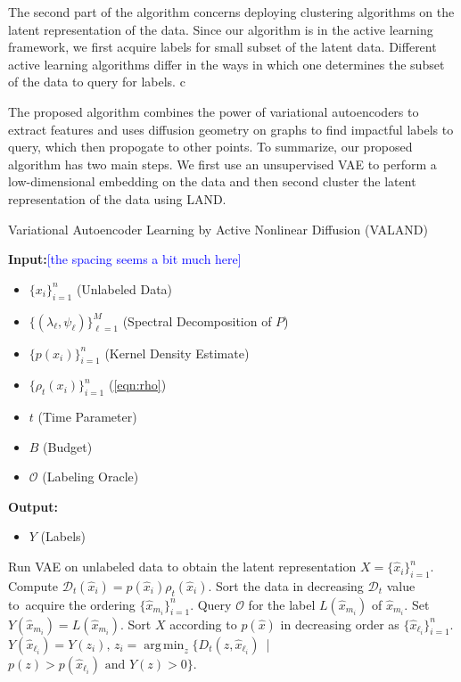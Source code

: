 \documentclass{article}
\def\hx{{\hat x}}
\newcommand{\Dt}{\mathcal{D}_{t}}
\DeclareMathOperator*{\argmin}{arg\,min}
\newcommand{\JMM}[1]{{\textcolor{blue}{[#1]}}}
\begin{document}
The second part of the algorithm concerns deploying clustering algorithms on the latent representation of the data. Since our algorithm is in the active learning framework, we first acquire labels for small subset of the latent data. Different active learning algorithms differ in the ways in which one determines the subset of the data to query for labels. c


The proposed algorithm combines the power of variational autoencoders to extract features and uses diffusion geometry on graphs to find impactful labels to query, which then propogate to other points. To summarize, our proposed algorithm has two main steps.  We first use an unsupervised VAE to perform a low-dimensional embedding on the data and then second cluster the latent representation of the data using LAND. 

\begin{algorithm}[!htb]
	\caption{\label{alg:VALAND}Variational Autoencoder Learning by Active Nonlinear Diffusion (VALAND)}
	\flushleft
	\flushleft
	\textbf{Input:}\JMM{the spacing seems a bit much here}
	\vspace{-0.3em}
	\begin{itemize}
	\item $\{x_{i}\}_{i=1}^{n}$ (Unlabeled Data)\\
	 \item $\{(\lambda_{\ell},\psi_{\ell})\}_{\ell=1}^{M}$ (Spectral Decomposition of $P$)\\
	 \item $\{p(x_{i})\}_{i=1}^{n}$ (Kernel Density Estimate)\\
	 \item $\{\rho_{t}(x_{i})\}_{i=1}^{n}$ (\ref{eqn:rho})\\
	 \item $t$ (Time Parameter)\\
	 \item $B$ (Budget)\\
	 \item $\mathcal{O}$ (Labeling Oracle)\\
	  \end{itemize}
	\textbf{Output:} 
	\begin{itemize}
	\item $Y$ (Labels)
	\end{itemize}
	\begin{algorithmic}[1]
	\STATE Run VAE on unlabeled data to obtain  the latent representation $X = \{\hx_{i}\}_{i=1}^{n}$.  
	\STATE Compute $\Dt(\hx_{i})=p(\hx_{i})\rho_{t}(\hx_{i})$.  
	\STATE Sort the data in decreasing $\Dt$ value to\ 
	acquire the ordering $\{\hx_{m_{i}}\}_{i=1}^{n}$.
	\STATE Query $\mathcal{O}$ for the label $L(\hx_{m_{i}})$ of $\hx_{m_{i}}$.
	\STATE Set $Y(\hx_{m_{i}})=L(\hx_{m_{i}})$.
	\ENDFOR
	\STATE Sort $X$ according to $p(\hx)$ in decreasing order as $\{\hx_{\ell_{i}}\}_{i=1}^{n}$.  
	\FOR{$i=1:n$}
	\IF{$Y(\hx_{\ell_{i}})=0$}
	\STATE $Y(\hx_{\ell_{i}})=Y(z_{i}), \, z_{i}=\displaystyle\argmin_{z}\{D_{t}(z,\hx_{\ell_{i}})$\ | \ $p(z)>p(\hx_{\ell_{i}}) \text{ and } Y(z)>0\}$.
	\ENDIF
	\ENDFOR
	\end{algorithmic}
\end{algorithm}
\end{document}

